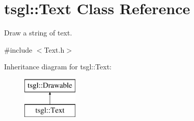 \hypertarget{classtsgl_1_1_text}{}\section{tsgl\+:\+:Text Class Reference}
\label{classtsgl_1_1_text}


Draw a string of text.  




{\ttfamily \#include $<$Text.\+h$>$}

Inheritance diagram for tsgl\+:\+:Text\+:\begin{figure}[H]
\begin{center}
\leavevmode
\includegraphics[height=2.000000cm]{classtsgl_1_1_text}
\end{center}
\end{figure}
